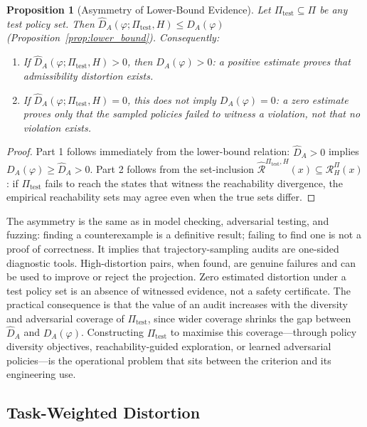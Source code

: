 \documentclass[11pt, a4paper]{article}
\theoremstyle{plain}
\newtheorem{proposition}{Proposition}
\theoremstyle{definition}
\theoremstyle{remark}
\newcommand{\RHP}{\mathcal{R}_H^\Pi}
\newcommand{\DA}{D_A(\varphi)}
\begin{document}
\begin{proposition}[Asymmetry of Lower-Bound Evidence]
\label{prop:asymmetry}
Let $\Pi_{\mathrm{test}} \subseteq \Pi$ be any test policy set. Then
$\hat{D}_A(\varphi; \Pi_{\mathrm{test}}, H) \leq \DA$ (Proposition~\ref{prop:lower_bound}).
Consequently:
\begin{enumerate}
  \item If $\hat{D}_A(\varphi; \Pi_{\mathrm{test}}, H) > 0$, then $\DA > 0$:
    a positive estimate \emph{proves} that admissibility distortion exists.
  \item If $\hat{D}_A(\varphi; \Pi_{\mathrm{test}}, H) = 0$, this does not
    imply $\DA = 0$: a zero estimate proves only that \emph{the sampled policies
    failed to witness a violation}, not that no violation exists.
\end{enumerate}
\end{proposition}

\begin{proof}
Part 1 follows immediately from the lower-bound relation: $\hat{D}_A > 0$ implies
$\DA \geq \hat{D}_A > 0$. Part 2 follows from the set-inclusion
$\hat{\mathcal{R}}^{\Pi_{\mathrm{test}}, H}(x) \subseteq \RHP(x)$: if
$\Pi_{\mathrm{test}}$ fails to reach the states that witness the reachability
divergence, the empirical reachability sets may agree even when the true sets
differ.
\end{proof}

The asymmetry is the same as in model checking, adversarial testing, and
fuzzing: finding a counterexample is a definitive result; failing to find one
is not a proof of correctness. It implies that trajectory-sampling audits are
one-sided diagnostic tools. High-distortion pairs, when found, are genuine
failures and can be used to improve or reject the projection. Zero estimated
distortion under a test policy set is an absence of witnessed evidence, not a
safety certificate. The practical consequence is that the value of an audit
increases with the diversity and adversarial coverage of $\Pi_{\mathrm{test}}$,
since wider coverage shrinks the gap between $\hat{D}_A$ and $\DA$. Constructing
$\Pi_{\mathrm{test}}$ to maximise this coverage---through policy diversity
objectives, reachability-guided exploration, or learned adversarial policies---is
the operational problem that sits between the criterion and its engineering use.

\subsection{Task-Weighted Distortion}
\end{document}
